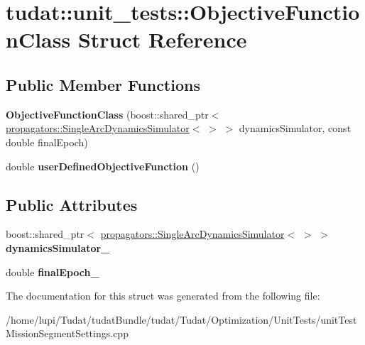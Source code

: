 \hypertarget{structtudat_1_1unit__tests_1_1ObjectiveFunctionClass}{}\section{tudat\+:\+:unit\+\_\+tests\+:\+:Objective\+Function\+Class Struct Reference}
\label{structtudat_1_1unit__tests_1_1ObjectiveFunctionClass}
\subsection*{Public Member Functions}
\begin{DoxyCompactItemize}
\item 
{\bfseries Objective\+Function\+Class} (boost\+::shared\+\_\+ptr$<$ \hyperlink{classtudat_1_1propagators_1_1SingleArcDynamicsSimulator}{propagators\+::\+Single\+Arc\+Dynamics\+Simulator}$<$  $>$ $>$ dynamics\+Simulator, const double final\+Epoch)\hypertarget{structtudat_1_1unit__tests_1_1ObjectiveFunctionClass_a4b143f155935e5934a3762048a6b971d}{}\label{structtudat_1_1unit__tests_1_1ObjectiveFunctionClass_a4b143f155935e5934a3762048a6b971d}

\item 
double {\bfseries user\+Defined\+Objective\+Function} ()\hypertarget{structtudat_1_1unit__tests_1_1ObjectiveFunctionClass_a2ef8da6b6115c8c24f398693f4df18ff}{}\label{structtudat_1_1unit__tests_1_1ObjectiveFunctionClass_a2ef8da6b6115c8c24f398693f4df18ff}

\end{DoxyCompactItemize}
\subsection*{Public Attributes}
\begin{DoxyCompactItemize}
\item 
boost\+::shared\+\_\+ptr$<$ \hyperlink{classtudat_1_1propagators_1_1SingleArcDynamicsSimulator}{propagators\+::\+Single\+Arc\+Dynamics\+Simulator}$<$  $>$ $>$ {\bfseries dynamics\+Simulator\+\_\+}\hypertarget{structtudat_1_1unit__tests_1_1ObjectiveFunctionClass_a0cb4835c6d5a15535822c55f2cd11573}{}\label{structtudat_1_1unit__tests_1_1ObjectiveFunctionClass_a0cb4835c6d5a15535822c55f2cd11573}

\item 
double {\bfseries final\+Epoch\+\_\+}\hypertarget{structtudat_1_1unit__tests_1_1ObjectiveFunctionClass_a1942b6a4b7af378e1e4109d1924c785c}{}\label{structtudat_1_1unit__tests_1_1ObjectiveFunctionClass_a1942b6a4b7af378e1e4109d1924c785c}

\end{DoxyCompactItemize}


The documentation for this struct was generated from the following file\+:\begin{DoxyCompactItemize}
\item 
/home/lupi/\+Tudat/tudat\+Bundle/tudat/\+Tudat/\+Optimization/\+Unit\+Tests/unit\+Test\+Mission\+Segment\+Settings.\+cpp\end{DoxyCompactItemize}
